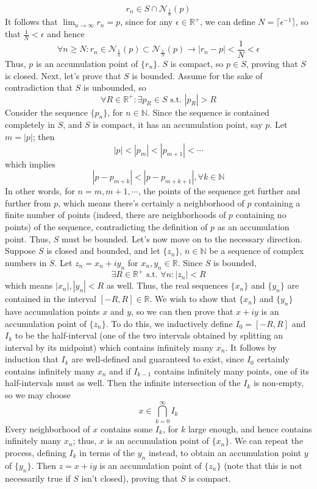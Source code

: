 \documentclass{article}
\newcommand*{\n}{\newline}
\newcommand*{\N}{\mathbb{N}}
\newcommand*{\R}{\mathbb{R}}
\newcommand*{\st}{\text{ s.t. }}
\begin{document}
$$ r_n \in S \cap \mathcal{N}_{\frac{1}{n}}(p) $$
It follows that $ \lim_{n \to \infty} r_n = p $, since for any $ \epsilon \in \R^+ $, we can define $ N = \lceil \epsilon^{-1} \rceil $, so that $ \frac{1}{N} < \epsilon $ and hence
$$ \forall n \geq N: r_n \in \mathcal{N}_{\frac{1}{n}}(p) \subset \mathcal{N}_{\frac{1}{N}}(p) \rightarrow | r_n - p | < \frac{1}{N} < \epsilon $$
Thus, $ p $ is an accumulation point of $ \{ r_n \} $. $ S $ is compact, so $ p \in S $, proving that $ S $ is closed. Next, let's prove that $ S $ is bounded. Assume for the sake of contradiction that $ S $ is unbounded, so
$$ \forall R \in \R^+: \exists p_R \in S \st | p_R | > R $$
Consider the sequence $ \{ p_n \} $, for $ n \in \N $. Since the sequence is contained completely in $ S $, and $ S $ is compact, it has an accumulation point, say $ p $. Let $ m = | p | $; then
$$ | p | < | p_m | < | p_{m + 1} | < \cdots $$
which implies
$$ | p - p_{m + k} | < | p - p_{m + k + 1} |, \forall k \in \N $$
In other words, for $ n = m, m + 1, \cdots $, the points of the sequence get further and further from $ p $, which means there's certainly a neighborhood of $ p $ containing a finite number of points (indeed, there are neighborhoods of $ p $ containing no points) of the sequence, contradicting the definition of $ p $ as an accumulation point. Thus, $ S $ must be bounded.
\n
\indent Let's now move on to the necessary direction. Suppose $ S $ is closed and bounded, and let $ \{ z_n \} $, $ n \in \N $ be a sequence of complex numbers in $ S $. Let $ z_n = x_n + i y_n $ for $ x_n, y_n \in \R $. Since $ S $ is bounded,
$$ \exists R \in \R^+ \st \forall n: | z_n | < R $$
which means $ | x_n |, | y_n | < R $ as well. Thus, the real sequences $ \{ x_n \} $ and $ \{ y_n \} $ are contained in the interval $ [ -R, R ] \in \R $. We wish to show that $ \{ x_n \} $ and $ \{ y_n \} $ have accumulation points $ x $ and $ y $, so we can then prove that $ x + i y $ is an accumulation point of $ \{ z_n \} $. To do this, we inductively define $ I_0 = [ -R, R ] $ and $ I_k $ to be the half-interval (one of the two intervals obtained by splitting an interval by its midpoint) which contains infinitely many $ x_n $. It follows by induction that $ I_k $ are well-defined and guaranteed to exist, since $ I_0 $ certainly contains infinitely many $ x_n $ and if $ I_{k - 1} $ contains infinitely many points, one of its half-intervals must as well.
\n
Then the infinite intersection of the $ I_k $ is non-empty, so we may choose
$$ x \in \bigcap_{k = 0}^\infty I_k $$
Every neighborhood of $ x $ contains some $ I_k $, for $ k $ large enough, and hence contains infinitely many $ x_n $; thus, $ x $ is an accumulation point of $ \{ x_n \} $. We can repeat the process, defining $ I_k $ in terms of the $ y_n $ instead, to obtain an accumulation point $ y $ of $ \{ y_n \} $. Then $ z = x + i y $ is an accumulation point of $ \{ z_n \} $ (note that this is not necessarily true if $ S $ isn't closed), proving that $ S $ is compact. \qedsymbol 
\end{document}
